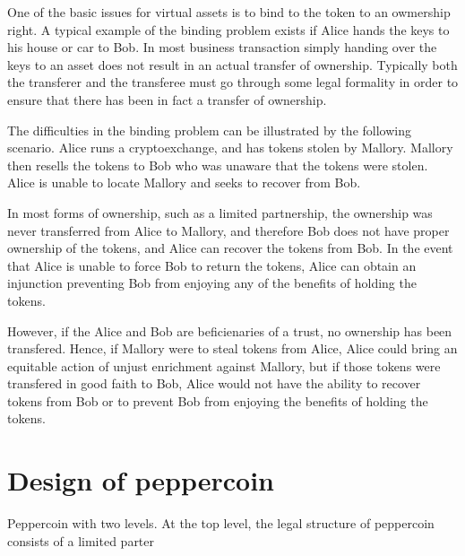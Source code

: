 \documentclass[12pt, letterpaper, twoside]{article}
\begin{document}
One of the basic issues for virtual assets is to bind to the token to
an owmership right.  A typical example of the binding problem exists
if Alice hands the keys to his house or car to Bob.  In most business
transaction simply handing over the keys to an asset does not result
in an actual transfer of ownership.  Typically both the transferer and
the transferee must go through some legal formality in order to ensure
that there has been in fact a transfer of ownership.

The difficulties in the binding problem can be illustrated by the
following scenario.  Alice runs a cryptoexchange, and has tokens
stolen by Mallory.  Mallory then resells the tokens to Bob who was
unaware that the tokens were stolen.  Alice is unable to locate
Mallory and seeks to recover from Bob.

In most forms of ownership, such as a limited partnership, the
ownership was never transferred from Alice to Mallory, and therefore
Bob does not have proper ownership of the tokens, and Alice can
recover the tokens from Bob.  In the event that Alice is unable to
force Bob to return the tokens, Alice can obtain an injunction
preventing Bob from enjoying any of the benefits of holding the
tokens.

However, if the Alice and Bob are beficienaries of a trust, no
ownership has been transfered.  Hence, if Mallory were to steal tokens
from Alice, Alice could bring an equitable action of unjust enrichment
against Mallory, but if those tokens were transfered in good faith to
Bob, Alice would not have the ability to recover tokens from Bob or to
prevent Bob from enjoying the benefits of holding the tokens.


\section{Design of peppercoin}

Peppercoin with two levels.  At the top level, the legal structure of
peppercoin consists of a limited parter
\end{document}
